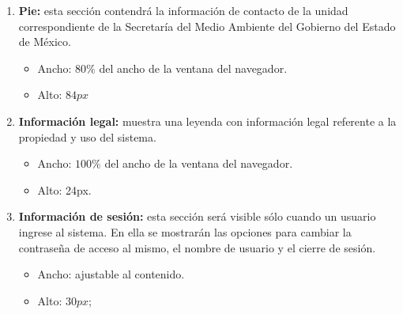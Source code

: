 \begin{enumerate}
        \item {\bf Pie:} esta sección contendrá la información de contacto de la unidad correspondiente de la Secretaría del Medio Ambiente del Gobierno del Estado de México.
        \begin{itemize}
            \item Ancho: $80\%$ del ancho de la ventana del navegador.
            \item Alto: $84px$
        \end{itemize}
        
        \item {\bf Información legal:} muestra una leyenda con información legal referente a la propiedad y uso del sistema.
        \begin{itemize}
            \item Ancho: $100\%$ del ancho de la ventana del navegador.
            \item Alto: 24px.
        \end{itemize}
        
        \item {\bf Información de sesión:} esta sección será visible sólo cuando un usuario ingrese al sistema. En ella se mostrarán las opciones para cambiar la contraseña de acceso al mismo, el nombre de usuario y el cierre de sesión.
        \begin{itemize}
            \item Ancho: ajustable al contenido.
            \item Alto: $30px$;
        \end{itemize}
    \end{enumerate}

  
		
		
		
